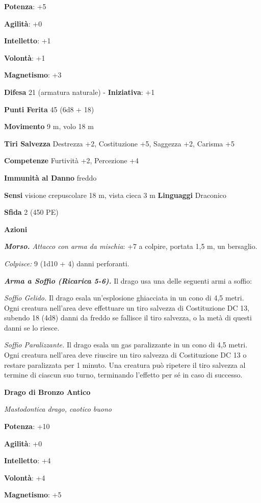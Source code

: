 \begin{multicols}{2}
\textbf{Potenza}: +5

\textbf{Agilità}: +0

\textbf{Intelletto}: +1

\textbf{Volontà}: +1

\textbf{Magnetismo}: +3

\textbf{Difesa} 21 (armatura naturale) - \textbf{Iniziativa}: +1

\textbf{Punti Ferita} 45 (6d8 + 18)

\textbf{Movimento} 9 m, volo 18 m

\textbf{Tiri Salvezza} Destrezza +2, Costituzione +5, Saggezza +2,
Carisma +5

\textbf{Competenze} Furtività +2, Percezione +4

\textbf{Immunità al Danno} freddo

\textbf{Sensi} visione crepuscolare 18 m, vista cieca 3 m
\textbf{Linguaggi} Draconico

\textbf{Sfida} 2 (450 PE)

\textbf{Azioni}

\emph{\textbf{Morso.} Attacco con arma da mischia}: +7 a colpire,
portata 1,5 m, un bersaglio.

\emph{Colpisce:} 9 (1d10 + 4) danni perforanti.

\emph{\textbf{Arma a Soffio (Ricarica 5-6).}} Il drago usa una delle
seguenti armi a soffio:

\emph{Soffio Gelido.} Il drago esala un'esplosione ghiacciata in un cono
di 4,5 metri. Ogni creatura nell'area deve effettuare un tiro salvezza
di Costituzione DC 13, subendo 18 (4d8) danni da freddo se fallisce il
tiro salvezza, o la metà di questi danni se lo riesce.

\emph{Soffio Paralizzante.} Il drago esala un gas paralizzante in un
cono di 4,5 metri. Ogni creatura nell'area deve riuscire un tiro
salvezza di Costituzione DC 13 o restare paralizzata per 1 minuto. Una
creatura può ripetere il tiro salvezza al termine di ciascun suo turno,
terminando l'effetto per sé in caso di successo.



\textbf{Drago di Bronzo Antico}

\emph{Mastodontica drago, caotico buono}

\textbf{Potenza}: +10

\textbf{Agilità}: +0

\textbf{Intelletto}: +4

\textbf{Volontà}: +4

\textbf{Magnetismo}: +5


\end{multicols}
